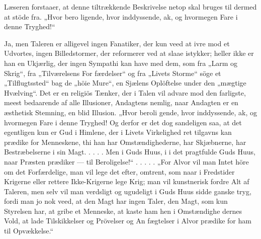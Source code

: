 \documentclass[12pt,a4paper]{article}
\newcommand{\opage}[1]{\marginnote{\footnotesize\textit{[#1]}}}
\begin{document}
Læseren forstaaer, at denne tiltrækkende Beskrivelse
netop skal bruges til dermed at stöde fra. „Hvor bero\-%
ligende, hvor inddyssende, ak, og hvormegen Fare i
denne Tryghed!“

Ja, men Taleren er alligevel ingen Fanatiker, der
kun veed at ivre mod et Udvortes, ingen Billedstormer,
der reformerer ved at slaae istykker; heller ikke er
\opage{13} %
han en Ukjærlig, der ingen Sympathi kan have med
dem, som fra „Larm og Skrig“, fra „Tilværelsens For\-%
færdelser“ og fra „Livets Storme“ söge et „Tilflugtssted“
bag de „höie Mure“, en Sjælens Oplöftelse under den
„mægtige Hvælving“. Det er en religiös Tænker, der i
Talen vil advare mod den farligste, meest bedaarende
af alle Illusioner, Andagtens nemlig, naar Andagten er
en æsthetisk Stemning, en blid Illusion. „Hvor beroli\-%
gende, hvor inddyssende, ak, og hvormegen Fare i
denne Tryghed! Og derfor er det dog sandeligen saa,
at det egentligen kun er Gud i Himlene, der i Livets
Virkelighed ret tilgavns kan prædike for Menneskene,
thi han har Omstændighederne, har Skjæbnerne, har
Bestræbelserne i sin Magt. . . . . Men i Guds Huus, i
i det pragtfulde Guds Huus, naar Præsten prædiker ---
til Beroligelse!“ . . . . . „For Alvor vil man Intet höre
om det Forfærdelige, man vil lege det efter, omtrent,
som naar i Fredstider Krigerne eller rettere Ikke-Krigerne
lege Krig; man vil kunstnerisk fordre Alt af Taleren,
men selv vil man verdsligt og ugudeligt i Guds Huus
sidde ganske tryg, fordi man jo nok veed, at den Magt
har ingen Taler, den Magt, som kun Styrelsen har, at
gribe et Menneske, at kaste ham hen i Omstændighe\-%
dernes Vold, at lade Tilskikkelser og Prövelser og An\-%
fægtelser i Alvor prædike for ham til Opvækkelse.“
\end{document}
